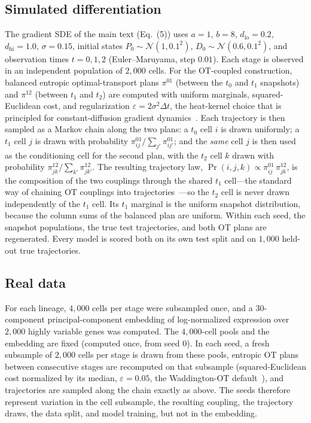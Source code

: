 \documentclass[10pt,journal,compsoc]{IEEEtran}
\begin{document}
\subsection{Simulated differentiation}
The gradient SDE of the main text (Eq.~(5)) uses $a=1$, $b=8$, $d_{\mathrm{lo}}=0.2$, $d_{\mathrm{hi}}=1.0$, $\sigma=0.15$, initial states $P_0\sim\mathcal{N}(1,0.1^2)$, $D_0\sim\mathcal{N}(0.6,0.1^2)$, and observation times $t=0,1,2$ (Euler--Maruyama, step $0.01$). Each stage is observed in an independent population of $2{,}000$ cells. For the OT-coupled construction, balanced entropic optimal-transport plans $\pi^{01}$ (between the $t_0$ and $t_1$ snapshots) and $\pi^{12}$ (between $t_1$ and $t_2$) are computed with uniform marginals, squared-Euclidean cost, and regularization $\varepsilon=2\sigma^2\Delta t$, the heat-kernel choice that is principled for constant-diffusion gradient dynamics~\cite{lavenant2024toward}. Each trajectory is then sampled as a Markov chain along the two plans: a $t_0$ cell $i$ is drawn uniformly; a $t_1$ cell $j$ is drawn with probability $\pi^{01}_{ij}/\sum_{j'}\pi^{01}_{ij'}$; and the \emph{same} cell $j$ is then used as the conditioning cell for the second plan, with the $t_2$ cell $k$ drawn with probability $\pi^{12}_{jk}/\sum_{k'}\pi^{12}_{jk'}$. The resulting trajectory law, $\Pr(i,j,k)\propto\pi^{01}_{ij}\,\pi^{12}_{jk}$, is the composition of the two couplings through the shared $t_1$ cell---the standard way of chaining OT couplings into trajectories~\cite{schiebinger2019optimal}---so the $t_2$ cell is never drawn independently of the $t_1$ cell. Its $t_1$ marginal is the uniform snapshot distribution, because the column sums of the balanced plan are uniform. Within each seed, the snapshot populations, the true test trajectories, and both OT plans are regenerated. Every model is scored both on its own test split and on $1{,}000$ held-out true trajectories.

\subsection{Real data}
For each lineage, $4{,}000$ cells per stage were subsampled once, and a $30$-component principal-component embedding of log-normalized expression over $2{,}000$ highly variable genes was computed. The $4{,}000$-cell pools and the embedding are fixed (computed once, from seed $0$). In each seed, a fresh subsample of $2{,}000$ cells per stage is drawn from these pools, entropic OT plans between consecutive stages are recomputed on that subsample (squared-Euclidean cost normalized by its median, $\varepsilon=0.05$, the Waddington-OT default~\cite{schiebinger2019optimal}), and trajectories are sampled along the chain exactly as above. The seeds therefore represent variation in the cell subsample, the resulting coupling, the trajectory draws, the data split, and model training, but not in the embedding.
\end{document}
